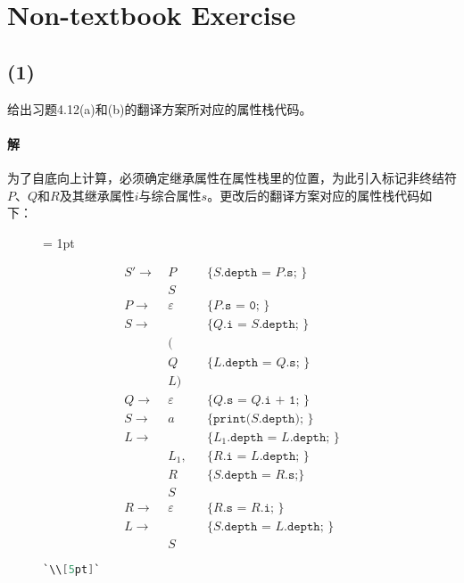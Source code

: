 \documentclass{article}
\begin{document}
\section{Non-textbook Exercise}
\subsection*{(1)}
给出习题4.12(a)和(b)的翻译方案所对应的属性栈代码。

\paragraph{解}
为了自底向上计算，必须确定继承属性在属性栈里的位置，为此引入标记非终结符$P$、$Q$和$R$及其继承属性$i$与综合属性$s$。更改后的翻译方案对应的属性栈代码如下：

\begin{figure}[H]
    \centering
    \columnseprule = 1pt
    \begin{multicols}{2}
    \begin{align*}
        S' \rightarrow\ &P&& \texttt{\{ }S\texttt{.depth = }P\texttt{.s; \}} \\
                        &S&& \\
        P \rightarrow\  &\varepsilon&& \texttt{\{ }P\texttt{.s = 0; \}} \\
        S \rightarrow\  & && \texttt{\{ }Q\texttt{.i = }S\texttt{.depth; \}} \\
                        &(&& \\
                        &Q&& \texttt{\{ }L\texttt{.depth = }Q\texttt{.s; \}} \\
                        &L)&& \\
        Q \rightarrow\  &\varepsilon&& \texttt{\{ }Q\texttt{.s = }Q\texttt{.i + 1; \}} \\
        S \rightarrow\  &a&& \texttt{\{ print(}S\texttt{.depth); \}}\\
        L \rightarrow\ & &&\texttt{\{ }L_1\texttt{.depth = }L\texttt{.depth; \}} \\
                        &L_1,&& \texttt{\{ }R\texttt{.i = }L\texttt{.depth; \}} \\
                        &R&& \texttt{\{ }S\texttt{.depth = }R\texttt{.s;\} } \\
                        &S&& \\
        R \rightarrow\  &\varepsilon&& \texttt{\{ }R\texttt{.s = }R\texttt{.i; \}} \\
        L \rightarrow\  & &&\texttt{\{ }S\texttt{.depth = }L\texttt{.depth; \}}\\
                        &S&&
    \end{align*}
    \begin{lstlisting}[language = C,
        keywordstyle=\bfseries\color{blue!70},
        commentstyle=\color{white!80!black},
        frame=shadowbox,
        framerule = 3pt,
        rulesepcolor = \color{white},
        xleftmargin = 2mm,
        rulecolor = \color{white},
        basicstyle=\ttfamily\small,
        lineskip = 11.5pt,
        escapeinside=``]
`\\[5pt]`


\end{lstlisting}
\end{multicols}
\end{figure}
\end{document}
